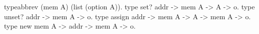\begin{elpicode}
  typeabbrev (mem A) (list (option A)).
  type set? addr -> mem A -> A -> o.
  type unset? addr -> mem A -> o.
  type assign addr -> mem A -> A -> mem A -> o.
  type new mem A -> addr -> mem A -> o.
\end{elpicode}

